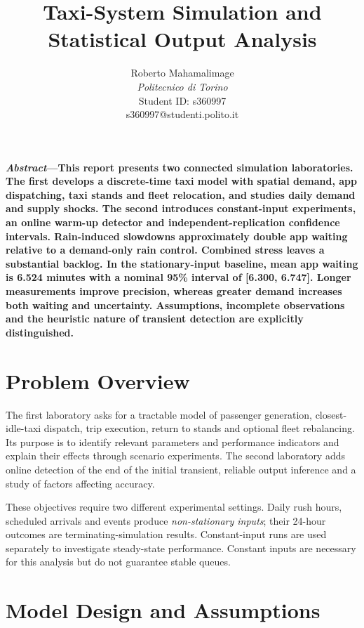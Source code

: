 \documentclass[10pt,twocolumn,letterpaper]{article}
\title{\fontsize{20}{23}\selectfont Taxi-System Simulation and Statistical Output Analysis}
\author{\normalsize Roberto Mahamalimage\\
\normalsize\textit{Politecnico di Torino}\\
\normalsize Student ID: s360997\\
\normalsize s360997@studenti.polito.it}
\date{}
\begin{document}
\maketitle

\noindent\textbf{\textit{Abstract}---This report presents two connected simulation
laboratories. The first develops a discrete-time taxi model with spatial demand,
app dispatching, taxi stands and fleet relocation, and studies daily demand and
supply shocks. The second introduces constant-input experiments, an online
warm-up detector and independent-replication confidence intervals. Rain-induced
slowdowns approximately double app waiting relative to a demand-only rain
control. Combined stress leaves a substantial backlog. In the stationary-input
baseline, mean app waiting is 6.524 minutes with a nominal 95\% interval of
[6.300, 6.747]. Longer measurements improve precision, whereas greater demand
increases both waiting and uncertainty. Assumptions, incomplete observations
and the heuristic nature of transient detection are explicitly distinguished.}

\section{Problem Overview}
The first laboratory asks for a tractable model of passenger generation,
closest-idle-taxi dispatch, trip execution, return to stands and optional fleet
rebalancing. Its purpose is to identify relevant parameters and performance
indicators and explain their effects through scenario experiments. The second
laboratory adds online detection of the end of the initial transient, reliable
output inference and a study of factors affecting accuracy.

These objectives require two different experimental settings. Daily rush hours,
scheduled arrivals and events produce \emph{non-stationary inputs}; their
24-hour outcomes are terminating-simulation results. Constant-input runs are
used separately to investigate steady-state performance. Constant inputs are
necessary for this analysis but do not guarantee stable queues.

\section{Model Design and Assumptions}
\end{document}
